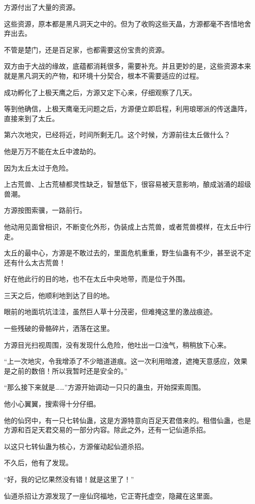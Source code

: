 \begin{this_body}
方源付出了大量的资源。

这些资源，原本都是黑凡洞天之中的。但为了收购这些天晶，方源都毫不吝惜地舍弃出去。

不管是楚门，还是百足家，也都需要这份宝贵的资源。

双方由于大战的缘故，底蕴都消耗很多，需要补充。并且更妙的是，这些资源本来就是黑凡洞天的产物，和环境十分契合，根本不需要适应的过程。

成功孵化了上极天鹰之后，方源又定下心来，仔细观察了几天。

等到他确信，上极天鹰毫无问题之后，方源便立即启程，利用琅琊派的传送蛊阵，直接来到了太丘。

第六次地灾，已经将近，时间所剩无几。这个时候，方源前往太丘做什么？

他是万万不能在太丘中渡劫的。

因为太丘太过于危险。

上古荒兽、上古荒植都灵性缺乏，智慧低下，很容易被天意影响，酿成汹涌的超级兽潮。

方源按图索骥，一路前行。

他动用见面曾相识，不断变化外形，伪装成上古荒兽，或者荒兽模样，在太丘中行走。

太丘的最中心，方源是不敢过去的，里面危机重重，野生仙蛊有不少，甚至说不定还有什么太古荒兽！

好在他此行的目的地，也不在太丘中央地带，而是位于外围。

三天之后，他顺利地到达了目的地。

眼前的地面坑坑洼洼，虽然巨人草十分茂密，但难掩这里的激战痕迹。

一些残破的骨骼碎片，洒落在这里。

方源目光扫视周围，没有发现什么危险，他吐出一口浊气，稍稍放下心来。

“上一次地灾，令我增添了不少暗道道痕。这一次利用暗渡，遮掩天意感应，效果是之前的数倍！所以我暂时还是安全的。”

“那么接下来就是……”方源开始调动一只只的蛊虫，开始探索周围。

他小心翼翼，搜索得十分仔细。

他的仙窍中，有一只七转仙蛊，这是方源特意向百足天君借来的。租借仙蛊，也是方源和百足天君交易的一部分内容。除此之外，还有一记仙道杀招。

以这只七转仙蛊为核心，方源催动起仙道杀招。

不久后，他有了发现。

“好，我的记忆果然没有错！就是这里了！”

仙道杀招让方源发现了一座仙窍福地，它正寄托虚空，隐藏在这里面。


\end{this_body}

